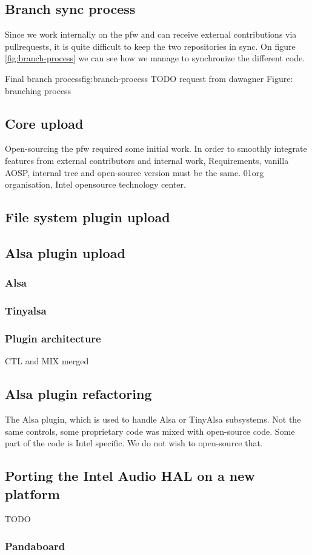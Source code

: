 \subsection{Branch sync process}
Since we work internally on the \gls{pfw} and can receive external contributions via \gls{pullrequests},
it is quite difficult to keep the two repositories in sync.
On figure \ref{fig:branch-process} we can see how we manage to synchronize the different code.

\begin{figureGraphics}{Final branch process}{fig:branch-process}
    TODO request from dawagner
    Figure: branching process
\end{figureGraphics}


\subsection{Core upload}
Open-sourcing the \gls{pfw} required some initial work.
In order to smoothly integrate features from external contributors and internal work,
Requirements, vanilla AOSP, internal tree and open-source version must be the
same.
01org organisation, Intel opensource technology center.

\subsection{File system plugin upload}

\subsection{Alsa plugin upload}
\subsubsection{Alsa}
\subsubsection{Tinyalsa}
\subsubsection{Plugin architecture}
CTL and MIX merged

\subsection{Alsa plugin refactoring}
The Alsa plugin, which is used to handle Alsa or TinyAlsa subsystems.
Not the same controls, some proprietary code was mixed with open-source code.
Some part of the code is Intel specific. We do not wish to open-source that.




\subsection{Porting the Intel Audio HAL on a new platform}
TODO
\subsubsection{Pandaboard}


